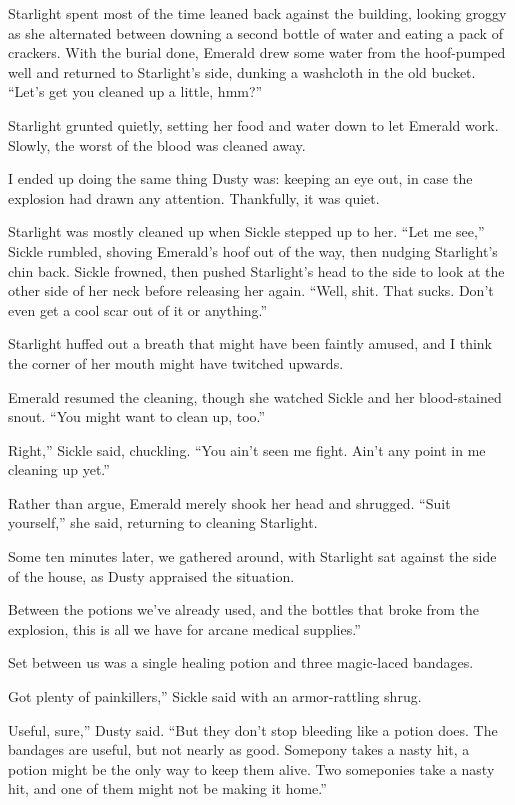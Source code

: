 Starlight spent most of the time leaned back against the building, looking groggy as she alternated between downing a second bottle of water and eating a pack of crackers. With the burial done, Emerald drew some water from the hoof-pumped well and returned to Starlight’s side, dunking a washcloth in the old bucket. “Let’s get you cleaned up a little, hmm?”

Starlight grunted quietly, setting her food and water down to let Emerald work. Slowly, the worst of the blood was cleaned away.

I ended up doing the same thing Dusty was: keeping an eye out, in case the explosion had drawn any attention. Thankfully, it was quiet.

Starlight was mostly cleaned up when Sickle stepped up to her. “Let me see,” Sickle rumbled, shoving Emerald’s hoof out of the way, then nudging Starlight’s chin back. Sickle frowned, then pushed Starlight’s head to the side to look at the other side of her neck before releasing her again. “Well, shit. That sucks. Don’t even get a cool scar out of it or anything.”

Starlight huffed out a breath that might have been faintly amused, and I think the corner of her mouth might have twitched upwards.

Emerald resumed the cleaning, though she watched Sickle and her blood-stained snout. “You might want to clean up, too.”

\leavevmode{}Right,” Sickle said, chuckling. “You ain’t seen me fight. Ain’t any point in me cleaning up yet.”

Rather than argue, Emerald merely shook her head and shrugged. “Suit yourself,” she said, returning to cleaning Starlight.

Some ten minutes later, we gathered around, with Starlight sat against the side of the house, as Dusty appraised the situation.

\leavevmode{}Between the potions we’ve already used, and the bottles that broke from the explosion, this is all we have for arcane medical supplies.”

Set between us was a single healing potion and three magic-laced bandages.

\leavevmode{}Got plenty of painkillers,” Sickle said with an armor-rattling shrug.

\leavevmode{}Useful, sure,” Dusty said. “But they don’t stop bleeding like a potion does. The bandages are useful, but not nearly as good. Somepony takes a nasty hit, a potion might be the only way to keep them alive. Two someponies take a nasty hit, and one of them might not be making it home.”

